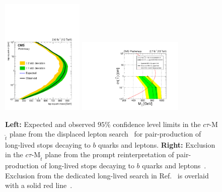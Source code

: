 \begin{figure}[h]
\begin{center}
\includegraphics[width=0.35\textwidth,angle=0]{ch5-figures/CMS-PAS-EXO-16-022_Figure_004.pdf}
\includegraphics[width=0.45\textwidth,angle=0]{ch5-figures/CMS-PAS-EXO-16-007_Figure-aux_001.pdf}
\end{center}
\caption{{\bf Left:} Expected and observed $95\%$ confidence level limits in the $c\tau$-M$_{\tilde{t}}$ plane from the displaced lepton search~\cite{CMS-PAS-EXO-16-022} for pair-production of long-lived stops decaying to $b$ quarks and leptons. {\bf Right:} Exclusion in the $c\tau$-M$_{\tilde{t}}$ plane from the prompt reinterpretation of pair-production of long-lived stops decaying to $b$ quarks and leptons~\cite{CMS-PAS-EXO-16-007}. Exclusion from the dedicated long-lived search in Ref.~\cite{CMS-PAS-EXO-16-022} is overlaid with a solid red line~\cite{CMS-EXO-16-007url}.}
\label{fig:exo-16}
\end{figure}


